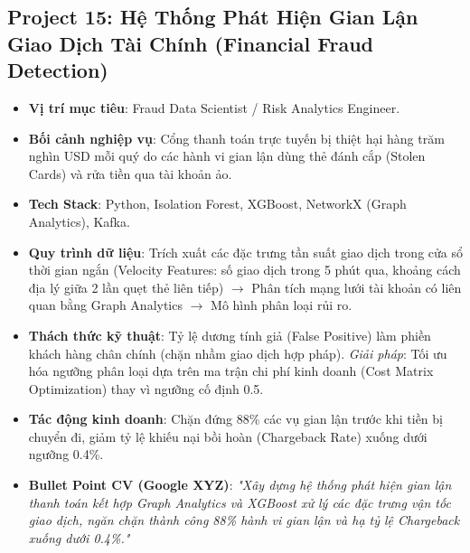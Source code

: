 \subsection{Project 15: Hệ Thống Phát Hiện Gian Lận Giao Dịch Tài Chính (Financial Fraud Detection)}
\begin{itemize}
    \item \textbf{Vị trí mục tiêu}: Fraud Data Scientist / Risk Analytics Engineer.
    \item \textbf{Bối cảnh nghiệp vụ}: Cổng thanh toán trực tuyến bị thiệt hại hàng trăm nghìn USD mỗi quý do các hành vi gian lận dùng thẻ đánh cắp (Stolen Cards) và rửa tiền qua tài khoản ảo.
    \item \textbf{Tech Stack}: Python, Isolation Forest, XGBoost, NetworkX (Graph Analytics), Kafka.
    \item \textbf{Quy trình dữ liệu}: Trích xuất các đặc trưng tần suất giao dịch trong cửa sổ thời gian ngắn (Velocity Features: số giao dịch trong 5 phút qua, khoảng cách địa lý giữa 2 lần quẹt thẻ liên tiếp) $\rightarrow$ Phân tích mạng lưới tài khoản có liên quan bằng Graph Analytics $\rightarrow$ Mô hình phân loại rủi ro.
    \item \textbf{Thách thức kỹ thuật}: Tỷ lệ dương tính giả (False Positive) làm phiền khách hàng chân chính (chặn nhầm giao dịch hợp pháp). \textit{Giải pháp}: Tối ưu hóa ngưỡng phân loại dựa trên ma trận chi phí kinh doanh (Cost Matrix Optimization) thay vì ngưỡng cố định 0.5.
    \item \textbf{Tác động kinh doanh}: Chặn đứng 88\% các vụ gian lận trước khi tiền bị chuyển đi, giảm tỷ lệ khiếu nại bồi hoàn (Chargeback Rate) xuống dưới ngưỡng 0.4\%.
    \item \textbf{Bullet Point CV (Google XYZ)}: \textit{"Xây dựng hệ thống phát hiện gian lận thanh toán kết hợp Graph Analytics và XGBoost xử lý các đặc trưng vận tốc giao dịch, ngăn chặn thành công 88\% hành vi gian lận và hạ tỷ lệ Chargeback xuống dưới 0.4\%."}
\end{itemize}

